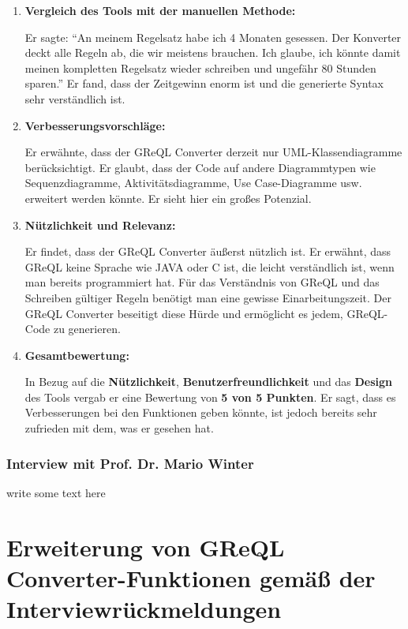 \begin{enumerate}[itemsep=8pt, parsep=5pt]
    \item \textbf{Vergleich des Tools mit der manuellen Methode:}

    Er sagte: ``An meinem Regelsatz habe ich 4 Monaten gesessen. Der Konverter deckt alle Regeln ab, die wir meistens
    brauchen. Ich glaube, ich könnte damit meinen kompletten Regelsatz wieder schreiben und ungefähr 80 Stunden sparen.''
    Er fand, dass der Zeitgewinn enorm ist und die generierte Syntax sehr verständlich ist.

    \item \textbf{Verbesserungsvorschläge:}

    Er erwähnte, dass der GReQL Converter derzeit nur UML-Klassendiagramme berücksichtigt. Er glaubt, dass der Code auf
    andere Diagrammtypen wie Sequenzdiagramme, Aktivitätsdiagramme, Use Case-Diagramme usw. erweitert werden könnte.
    Er sieht hier ein großes Potenzial.

    \item \textbf{Nützlichkeit und Relevanz:}

    Er findet, dass der GReQL Converter äußerst nützlich ist. Er erwähnt, dass GReQL keine Sprache wie JAVA oder C ist,
    die leicht verständlich ist, wenn man bereits programmiert hat. Für das Verständnis von GReQL und das Schreiben
    gültiger Regeln benötigt man eine gewisse Einarbeitungszeit. Der GReQL Converter beseitigt diese Hürde und
    ermöglicht es jedem, GReQL-Code zu generieren.

    \item \textbf{Gesamtbewertung:}

    In Bezug auf die \textbf{Nützlichkeit}, \textbf{Benutzerfreundlichkeit} und das \textbf{Design} des Tools vergab er
    eine Bewertung von \textbf{5 von 5 Punkten}. Er sagt, dass es Verbesserungen bei den Funktionen geben könnte, ist
    jedoch bereits sehr zufrieden mit dem, was er gesehen hat.

\end{enumerate}


\subsubsection{Interview mit Prof. Dr. Mario Winter}
write some text here

\section{Erweiterung von GReQL Converter-Funktionen gemäß der Interviewrückmeldungen}

